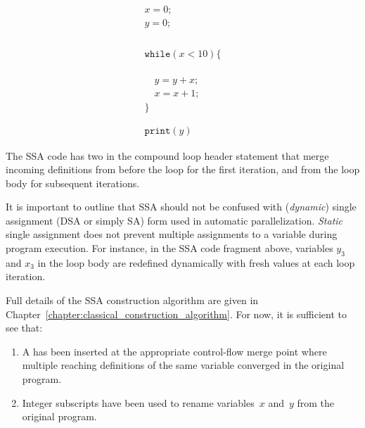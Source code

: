 \begin{minipage}{0.5\textwidth}
\begin{equation*}
\begin{array}{l}
x = 0;\\
y = 0;\\
~\\\\\\\\
\texttt{while} (x < 10) \{\\
~\\\\\\
\quad  y = y + x;\\
\quad  x = x + 1;\\
\}\\
~\\\\
\texttt{print}(y)
\end{array} 
\end{equation*}
\end{minipage}
\begin{minipage}{0.4\textwidth}
\end{minipage}
\bigskip

The SSA code has
two \phifuns in the compound loop header
statement that
merge incoming definitions from before the loop
for the first iteration,
and from the loop body for subsequent iterations.


It is important to outline that SSA should not be confused with (\emph{dynamic}) single assignment (DSA or simply SA) form used in automatic parallelization. \emph{Static} single assignment does not prevent multiple assignments to a variable
during program execution. For instance, in the SSA code fragment above,
variables $y_3$ and $x_3$ in the loop body are 
redefined dynamically with fresh values 
at each loop iteration. 

Full details of the SSA construction algorithm are given in 
Chapter~\ref{chapter:classical_construction_algorithm}. For now, it is sufficient to see that:
\begin{enumerate}
\item A \phifun has been
inserted at the appropriate control-flow merge point where multiple reaching
definitions of the same variable converged in the original program.
\item Integer subscripts have been used to rename
variables~$x$ and~$y$ from the original program.
\end{enumerate}


